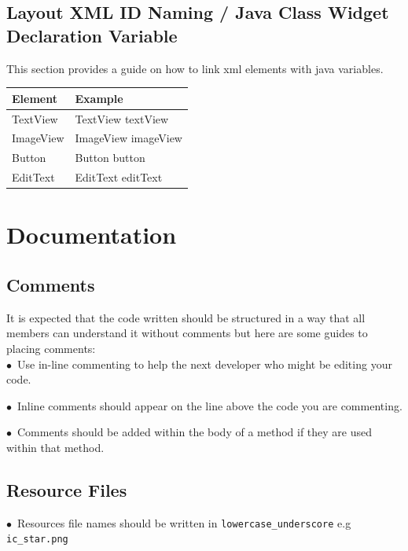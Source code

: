 \documentclass[english]{article}
\begin{document}
\subsection{Layout XML ID Naming / Java Class Widget Declaration Variable}
				
This section provides a guide on how to link xml elements with java variables.
				\\
				\begin{tabular}{ |p{3cm}|p{9cm}|  }
				\hline
				\textbf{Element} & \textbf{Example}  \\
				\hline
				TextView &	TextView textView\\
				\hline
				ImageView &	ImageView imageView\\
				\hline
				Button &	Button button\\
				\hline
				EditText &	EditText editText \\
				\hline
				\end{tabular}
\section{Documentation}

\subsection{Comments}
It is expected that the code written should be structured in a way that all members can understand it without comments but here are some guides to placing comments:\\
$\bullet$\ Use in-line commenting to help the next developer who might be editing your code.\par
$\bullet$\ Inline comments should appear on the line above the code you are commenting.\par
$\bullet$\ Comments should be added within the body of a method if they are used within that method.\par

\subsection{Resource Files}
$\bullet$\ Resources file names should be written in  \texttt{lowercase\_underscore}  e.g  \texttt{ic\_star.png} \par
\end{document}
